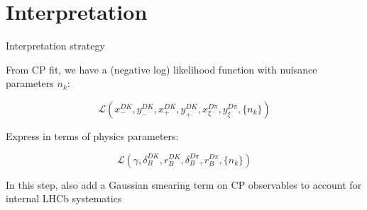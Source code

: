 \documentclass[xcolor={dvipsnames}]{beamer}
\begin{document}
\section{Interpretation}
\begin{frame}{Interpretation strategy}
  \begin{center}
    {\large From CP fit, we have a (negative log) likelihood function with nuisance parameters $n_k$:}
  \end{center}
  \begin{equation*}
    \mathcal{L}(x_-^{DK}, y_-^{DK}, x_+^{DK}, y_+^{DK}, x_\xi^{D\pi}, y_\xi^{D\pi}, \{n_k\})
  \end{equation*}
  \vspace{0.1cm}
  \begin{center}
    {\large Express in terms of physics parameters:}
  \end{center}
  \begin{equation*}
    \mathcal{L}(\gamma, \delta_B^{DK}, r_B^{DK}, \delta_B^{D\pi}, r_B^{D\pi}, \{n_k\})
  \end{equation*}
  \vspace{0.1cm}
  \begin{center}
    {\normalsize In this step, also add a Gaussian smearing term on CP observables to account for internal LHCb systematics}
  \end{center}
\end{frame}
\end{document}
